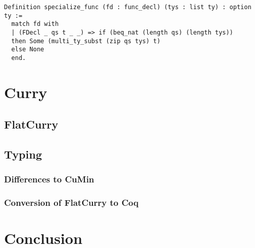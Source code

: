 \documentclass[fleqn]{scrreprt}
\newcommand{\todo}[1]{\marginpar{\textbf{TODO:} #1}}
\begin{document}
\begin{verbatim}
Definition specialize_func (fd : func_decl) (tys : list ty) : option ty := 
  match fd with
  | (FDecl _ qs t _ _) => if (beq_nat (length qs) (length tys))
  then Some (multi_ty_subst (zip qs tys) t)
  else None
  end.
\end{verbatim}
\chapter{Curry}
\section{FlatCurry}
\section{Typing}
\subsection{Differences to CuMin}
\subsection{Conversion of FlatCurry to Coq}
\chapter{Conclusion}

\appendix



\end{document}
